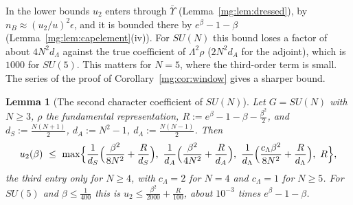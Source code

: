 \documentclass[11pt,a4paper]{article}
\newtheorem{lemma}[theorem]{Lemma}
\theoremstyle{definition}
\theoremstyle{remark}
\begin{document}
In the lower bounds $u_2$ enters through $\bar\Upsilon$ (Lemma~\ref{mg:lem:dressed}), by $n_B\approx(u_2/u)^2\epsilon$, and it is bounded there by $e^\beta-1-\beta$
(Lemma~\ref{mg:lem:capelement}(iv)). For $SU(N)$ this bound loses a factor of about $4N^2d_\Lambda$ against the true coefficient of $\Lambda^2\rho$ ($2N^2d_A$ for the adjoint), which is $1000$ for $SU(5)$.
This matters for $N=5$, where the third-order term is small. The series of the proof of Corollary~\ref{mg:cor:window} gives a sharper bound.

\begin{lemma}[The second character coefficient of $SU(N)$]\label{mg:lem:u2sun}
Let $G=SU(N)$ with $N\ge3$, $\rho$ the fundamental representation, $R:=e^\beta-1-\beta-\frac{\beta^2}2$, and $d_S:=\frac{N(N+1)}2$, $d_A:=N^2-1$, $d_\Lambda:=\frac{N(N-1)}2$. Then
\[
u_2(\beta)\ \le\ \max\Bigl\{\frac1{d_S}\Bigl(\frac{\beta^2}{8N^2}+\frac R{d_S}\Bigr),\ \frac1{d_A}\Bigl(\frac{\beta^2}{4N^2}+\frac R{d_A}\Bigr),\ \frac1{d_\Lambda}\Bigl(\frac{c_\Lambda\beta^2}{8N^2}+\frac R{d_\Lambda}\Bigr),\
R\Bigr\},
\]
the third entry only for $N\ge4$, with $c_\Lambda=2$ for $N=4$ and $c_\Lambda=1$ for $N\ge5$. For $SU(5)$ and $\beta\le\frac1{400}$ this is $u_2\le\frac{\beta^2}{2000}+\frac R{100}$, about $10^{-3}$ times
$e^\beta-1-\beta$.
\end{lemma}
\end{document}
